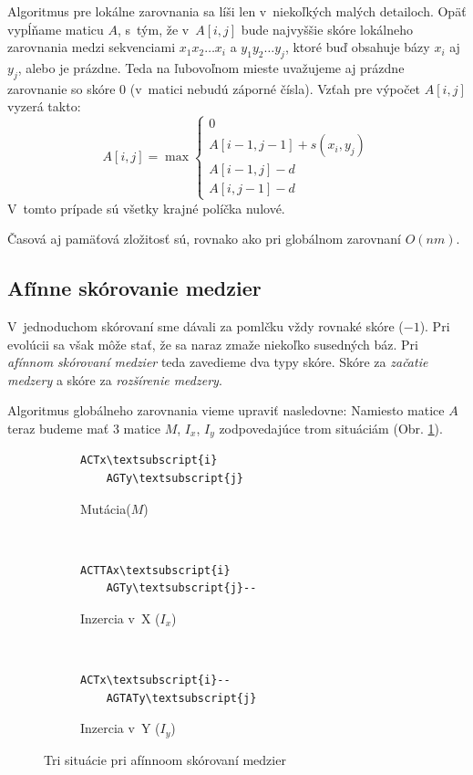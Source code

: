 Algoritmus pre lokálne zarovnania sa líši len v~niekoľkých malých detailoch. Opäť vypĺňame maticu $A$, s~tým, že v~$A[i,j]$ bude najvyššie skóre lokálneho zarovnania medzi sekvenciami $x_1x_2\dots x_i$ a $y_1y_2\dots y_j$, ktoré buď obsahuje bázy $x_i$ aj $y_j$, alebo je prázdne. Teda na ľubovoľnom mieste uvažujeme aj prázdne zarovnanie so skóre 0 (v~matici nebudú záporné čísla). Vzťah pre výpočet $A[i,j]$ vyzerá takto:
$$A[i,j] = \max \left\{
\begin{array}{l}
0\\
A[i-1,j-1]+s(x_i, y_j)\\
A[i-1,j]-d\\
A[i,j-1]-d
\end{array} \right.$$
V~tomto prípade sú všetky krajné políčka nulové.

Časová aj pamäťová zložitosť sú, rovnako ako pri globálnom zarovnaní $O(nm)$.

\subsection{Afínne skórovanie medzier}
\label{subsec:affine-gap-scoring}
V~jednoduchom skórovaní sme dávali za pomlčku vždy rovnaké skóre ($-1$). Pri evolúcii sa však môže stať, že sa naraz zmaže niekoľko susedných báz. Pri \textit{afínnom skórovaní medzier} teda zavedieme dva typy skóre. Skóre za \textit{začatie medzery} a skóre za \textit{rozšírenie medzery}.

Algoritmus globálneho zarovnania vieme upraviť nasledovne: Namiesto matice $A$ teraz budeme mať 3 matice $M$, $I_x$, $I_y$ zodpovedajúce trom situáciám (Obr. \ref{fig:affine-space-situations}).

\begin{figure}[htp]
    \centering
    \begin{subfigure}[m]{0.3\textwidth}
    \centering
    \begin{BVerbatim}[commandchars=\\\{\}]
    ACTx\textsubscript{i}
    AGTy\textsubscript{j}
    \end{BVerbatim}
    \caption{Mutácia($M$)}
    \end{subfigure}
    ~
    \begin{subfigure}[m]{0.3\textwidth}
    \centering
    \begin{BVerbatim}[commandchars=\\\{\}]
    ACTTAx\textsubscript{i}
    AGTy\textsubscript{j}--
    \end{BVerbatim}
    \caption{Inzercia v~X ($I_x$)}
    \end{subfigure}
    ~
    \begin{subfigure}[m]{0.3\textwidth}
    \centering
    \begin{BVerbatim}[commandchars=\\\{\}]
    ACTx\textsubscript{i}--
    AGTATy\textsubscript{j}
    \end{BVerbatim}
    \caption{Inzercia v~Y ($I_y$)}
    \end{subfigure}
    \caption[Situácie pri afínnoom skórovaní]{Tri situácie pri afínnoom skórovaní medzier}
    \label{fig:affine-space-situations}
\end{figure}

